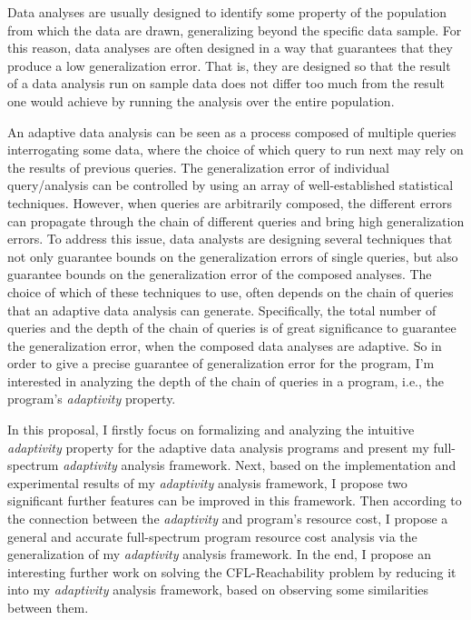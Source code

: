 Data analyses are usually designed to identify some property of the population from which the data are drawn, generalizing beyond the specific data sample. For this reason, data analyses are often designed in a way that guarantees that they produce a low generalization error.
 That is, they are designed so that the result of a data analysis run on sample data does not differ too much from the result one would achieve by running the analysis over the entire population. 
 
 An adaptive data analysis can be seen as a process composed of multiple queries interrogating some data, where the choice of which query to run next may rely on the results of previous queries. 
 The generalization error of individual query/analysis can be controlled by using an array of well-established statistical techniques.
 However, when queries are arbitrarily composed, the different errors can propagate through the chain of different queries and bring high generalization errors. 
 To address this issue, data analysts are designing several techniques that not only guarantee bounds on the generalization errors of single queries, but also guarantee bounds on the generalization error of the composed analyses. 
 The choice of which of these techniques to use, 
 often depends on the chain of queries that an adaptive data analysis can generate.
 Specifically, the total number of queries and the depth of the chain of queries is of great significance 
 to guarantee the generalization error, 
 when the composed data analyses are adaptive. 
 So in order to give a precise guarantee of generalization error
 for the program,
 I'm interested in analyzing the depth of the chain of queries in a program, i.e., the program's \emph{adaptivity} property.

 In this proposal, I firstly focus on formalizing and analyzing the intuitive \emph{adaptivity} property for the adaptive data analysis programs 
 and present 
 my full-spectrum \emph{adaptivity} analysis framework.
 Next, based on the implementation and experimental results of my \emph{adaptivity} analysis framework, 
 I propose two significant 
 further features can be improved in this framework.
Then according to the connection between the \emph{adaptivity} and program's resource cost,
I propose 
a general and accurate full-spectrum program resource cost analysis via
the generalization of my \emph{adaptivity} analysis framework.
In the end, 
I propose an interesting further work on solving the 
CFL-Reachability problem by reducing it into my \emph{adaptivity} analysis framework, 
based on observing some similarities between them.

